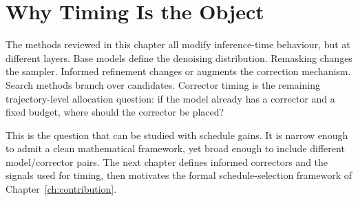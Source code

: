 \section{Why Timing Is the Object}
\label{sec:ch4-why-timing}

The methods reviewed in this chapter all modify inference-time behaviour, but
at different layers. Base models define the denoising distribution. Remasking
changes the sampler. Informed refinement changes or augments the correction
mechanism. Search methods branch over candidates. Corrector timing is the
remaining trajectory-level allocation question: if the model already has a
corrector and a fixed budget, where should the corrector be placed?

This is the question that can be studied with schedule gains. It is narrow
enough to admit a clean mathematical framework, yet broad enough to include
different model/corrector pairs. The next chapter defines informed correctors
and the signals used for timing, then motivates the formal schedule-selection
framework of Chapter~\ref{ch:contribution}.
